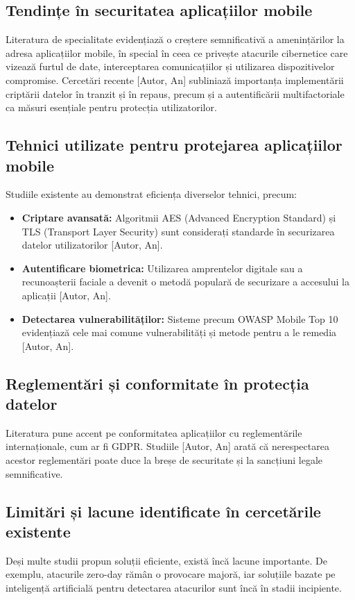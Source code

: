 \documentclass[runningheads]{llncs}
\begin{document}
\subsection{Tendințe în securitatea aplicațiilor mobile}
Literatura de specialitate evidențiază o creștere semnificativă a amenințărilor la adresa aplicațiilor mobile, în special în ceea ce privește atacurile cibernetice care vizează furtul de date, interceptarea comunicațiilor și utilizarea dispozitivelor compromise. Cercetări recente [Autor, An] subliniază importanța implementării criptării datelor în tranzit și în repaus, precum și a autentificării multifactoriale ca măsuri esențiale pentru protecția utilizatorilor.

\subsection{Tehnici utilizate pentru protejarea aplicațiilor mobile}
Studiile existente au demonstrat eficiența diverselor tehnici, precum:
\begin{itemize}
    \item \textbf{Criptare avansată:} Algoritmii AES (Advanced Encryption Standard) și TLS (Transport Layer Security) sunt considerați standarde în securizarea datelor utilizatorilor [Autor, An].
    \item \textbf{Autentificare biometrica:} Utilizarea amprentelor digitale sau a recunoașterii faciale a devenit o metodă populară de securizare a accesului la aplicații [Autor, An].
    \item \textbf{Detectarea vulnerabilităților:} Sisteme precum OWASP Mobile Top 10 evidențiază cele mai comune vulnerabilități și metode pentru a le remedia [Autor, An].
\end{itemize}

\subsection{Reglementări și conformitate în protecția datelor}
Literatura pune accent pe conformitatea aplicațiilor cu reglementările internaționale, cum ar fi GDPR. Studiile [Autor, An] arată că nerespectarea acestor reglementări poate duce la breșe de securitate și la sancțiuni legale semnificative.

\subsection{Limitări și lacune identificate în cercetările existente}
Deși multe studii propun soluții eficiente, există încă lacune importante. De exemplu, atacurile zero-day rămân o provocare majoră, iar soluțiile bazate pe inteligență artificială pentru detectarea atacurilor sunt încă în stadii incipiente.
\end{document}
